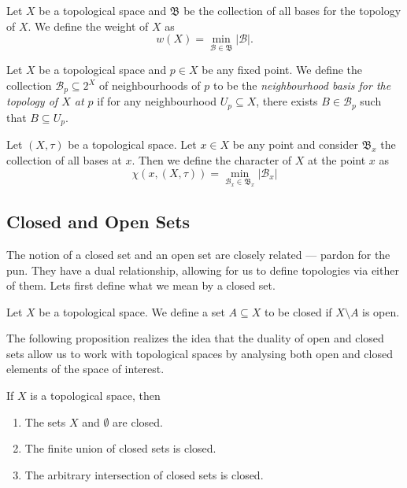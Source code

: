 \begin{definition}[Weight]\label{def: weight}
    Let \(X\) be a topological space and \(\mathfrak B\) be the collection of
    all bases for the topology of \(X\). We define the weight of \(X\) as
    \[
        w(X) = \min_{\mathcal B \in \mathfrak B} |\mathcal B|.
    \]
\end{definition}

\begin{definition}\label{def: basis at a point}
    Let \(X\) be a topological space and \(p \in X\) be any fixed point. We define
    the collection \(\mathcal B_p \subseteq 2^X\) of neighbourhoods of \(p\) to be
    the \emph{neighbourhood basis for the topology of \(X\) at \(p\)} if for any
    neighbourhood \(U_p \subseteq X\), there exists \(B \in \mathcal B_p\) such
    that \(B \subseteq U_p\).
\end{definition}

\begin{definition}\label{def: character}
    Let \((X, \tau)\) be a topological space. Let \(x \in X\) be any point
    and consider \(\mathfrak B_x\) the collection of all bases at \(x\). Then we
    define the character of \(X\) at the point \(x\) as
    \[
        \chi(x, (X, \tau))
        = \min_{\mathcal B_x \in \mathfrak B_x} |\mathcal B_x|
    \]
\end{definition}


\subsection{Closed and Open Sets}

The notion of a closed set and an open set are closely related --- pardon for
the pun. They have a dual relationship, allowing for us to define topologies via
either of them. Lets first define what we mean by a closed set.

\begin{definition}\label{def:closed-set}
    Let \(X\) be a topological space. We define a set \(A \subseteq X\) to be
    closed if \(X \setminus A\) is open.
\end{definition}

The following proposition realizes the idea that the duality of open and closed
sets allow us to work with topological spaces by analysing both open and closed
elements of the space of interest.

\begin{proposition}\label{prop:equiv-closed-topology}
    If \(X\) is a topological space, then
    \begin{enumerate}\setlength\itemsep{0em}
        \item The sets \(X\) and \(\emptyset\) are closed.

        \item The finite union of closed sets is closed.

        \item The arbitrary intersection of closed sets is closed.
    \end{enumerate}
\end{proposition}

